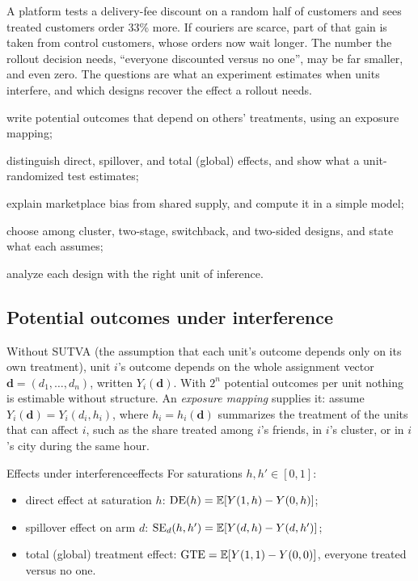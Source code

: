 \documentclass[11pt]{article}
\begin{document}

\begin{decision}
A platform tests a delivery-fee discount on a random half of customers and sees treated customers order 33\%
more. If couriers are scarce, part of that gain is taken from control customers, whose orders now wait longer.
The number the rollout decision needs, ``everyone discounted versus no one'', may be far smaller, and even zero.
The questions are what an experiment estimates when units interfere, and which designs recover the effect a
rollout needs.
\end{decision}

\begin{goals}
  \item write potential outcomes that depend on others' treatments, using an exposure mapping;
  \item distinguish direct, spillover, and total (global) effects, and show what a unit-randomized test estimates;
  \item explain marketplace bias from shared supply, and compute it in a simple model;
  \item choose among cluster, two-stage, switchback, and two-sided designs, and state what each assumes;
  \item analyze each design with the right unit of inference.
\end{goals}

\sectionone

\subsection{Potential outcomes under interference}

Without SUTVA (the assumption that each unit's outcome depends only on its own treatment), unit $i$'s outcome
depends on the whole assignment vector $\mathbf{d} = (d_1, \dots, d_n)$, written $Y_i(\mathbf{d})$. With $2^n$ potential outcomes per unit nothing is estimable without structure. An
\emph{exposure mapping} supplies it: assume $Y_i(\mathbf{d}) = Y_i(d_i, h_i)$, where $h_i = h_i(\mathbf{d})$ summarizes the
treatment of the units that can affect $i$, such as the share treated among $i$'s friends, in $i$'s cluster, or in
$i$'s city during the same hour.

\begin{defn}{Effects under interference}{effects}
For saturations $h, h' \in [0,1]$:
\begin{itemize}[leftmargin=1.2em]
  \item direct effect at saturation $h$: $\text{DE}(h) = \mathbb{E}[Y(1,h) - Y(0,h)]$;
  \item spillover effect on arm $d$: $\text{SE}_d(h, h') = \mathbb{E}[Y(d,h) - Y(d,h')]$;
  \item total (global) treatment effect: $\text{GTE} = \mathbb{E}[Y(1,1) - Y(0,0)]$, everyone treated versus no one.
\end{itemize}
\end{defn}
\end{document}
